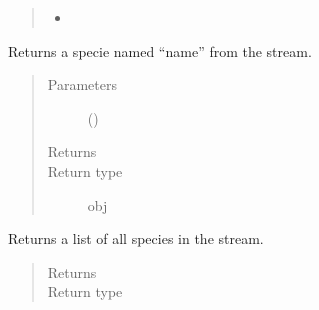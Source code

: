 \documentclass[letterpaper,10pt,openany,oneside,english]{sphinxmanual}
\begin{document}
\begin{fulllineitems}
\begin{fulllineitems}
\begin{quote}
\begin{description}
\begin{itemize}
\item {} 

\end{itemize}


\end{description}\end{quote}

\end{fulllineitems}


\begin{fulllineitems}
\label{\detokenize{support_rst/stream:stream.Stream.GetSpecie}}
Returns a specie named “name” from the stream.
\begin{quote}\begin{description}
\item[{Parameters}] \leavevmode
{} () \textendash{} 

\item[{Returns}] \leavevmode
{}

\item[{Return type}] \leavevmode
obj

\end{description}\end{quote}

\end{fulllineitems}


\begin{fulllineitems}
\label{\detokenize{support_rst/stream:stream.Stream.GetSpecies}}
Returns a list of all species in the stream.
\begin{quote}\begin{description}
\item[{Returns}] \leavevmode
{}

\item[{Return type}] \leavevmode
{}

\end{description}\end{quote}


\end{fulllineitems}
\end{fulllineitems}
\end{document}

